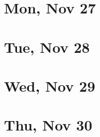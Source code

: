	\section{Mon, Nov 27}
		
		
	\section{Tue, Nov 28}
		
		
	\section{Wed, Nov 29}
		
		
	\section{Thu, Nov 30}
		
		
